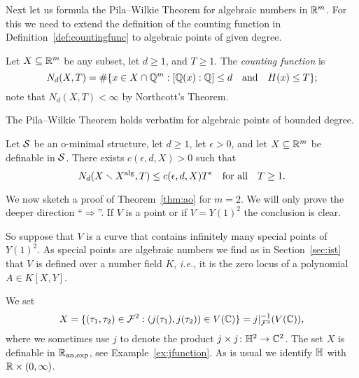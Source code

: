 Next let us formula the Pila--Wilkie Theorem for algebraic numbers in
${\mathbb{R}}^m$. For this we need to extend the definition of the counting
function in Definition~\ref{def:countingfunc} to algebraic points of
given degree.

\begin{definition}
  \label{def:countingfunc2}
  Let $X\subseteq{\mathbb{R}}^m$ be any subset, let $d\ge 1$, and $T\ge 1$.
  The \emph{counting
    function} is 
  \begin{equation*}
    N_d (X,T) = \#\{ x\in X\cap {\mathbb{Q}}^m : [{\mathbb{Q}}(x):{\mathbb{Q}}]\le d
    \quad\text{and}\quad
    H(x)\le T\};
  \end{equation*}
  note that $N_d(X,T)<\infty$ by Northcott's Theorem. 
\end{definition}

The Pila--Wilkie Theorem holds verbatim for algebraic points of
bounded degree. 

\begin{theorem}
  \label{thm:pilaalg}
  Let ${\mathcal S}$ be an o-minimal structure, let $d\ge 1$, let $\epsilon
  >0$, and   let $X\subseteq{\mathbb{R}}^m$ be
  definable in ${\mathcal S}$. 
  There exists  $c(\epsilon,d,X)>0$ such that
  \begin{equation*}
    N_d(X\smallsetminus X^{\mathrm{alg}},T)\le c(\epsilon,d,X) T^\epsilon \quad\text{for
      all}\quad T\ge 1.
  \end{equation*}
\end{theorem}

We now  sketch a proof  of Theorem~\ref{thm:ao} for $m=2$.
We will only prove the deeper direction ``$\Longrightarrow$''.
If $V$ is a point or if $V=Y(1)^2$ the conclusion is clear.

So suppose that $V$ is a curve that  contains infinitely many special points
of $Y(1)^2$. As special points are algebraic numbers we find as in Section~\ref{sec:ist} that
$V$ is defined over a number field $K$, \textit{i.e.}, it is the
zero locus of a polynomial $A \in K[X,Y]$.

We set
\begin{equation}
  \label{def:Xao}
  X = \{(\tau_1,\tau_2) \in {\mathcal F}^2 : (j(\tau_1),j(\tau_2)) \in V({\mathbb{C}}) \} =
  j|_{{\mathcal F}^2}^{-1}(V({\mathbb{C}})),
\end{equation}
where we sometimes use $j$ to denote the product $j\times j\colon
{\mathbb{H}}^2\rightarrow{\mathbb{C}}^2$. The set $X$ is definable in ${{\mathbb{R}}_{\mathrm{an,exp}}}$, see
Example~\ref{ex:jfunction}.
As is usual we identify ${\mathbb{H}}$ with ${\mathbb{R}} \times (0,\infty)$. 

